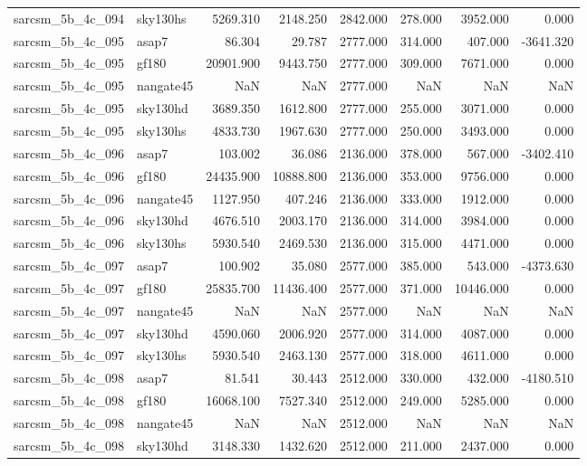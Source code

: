 \begin{tabular}{llrrrrrr}
sarcsm\_5b\_4c\_094 & sky130hs & 5269.310 & 2148.250 & 2842.000 & 278.000 & 3952.000 & 0.000 \\
sarcsm\_5b\_4c\_095 & asap7 & 86.304 & 29.787 & 2777.000 & 314.000 & 407.000 & -3641.320 \\
sarcsm\_5b\_4c\_095 & gf180 & 20901.900 & 9443.750 & 2777.000 & 309.000 & 7671.000 & 0.000 \\
sarcsm\_5b\_4c\_095 & nangate45 & NaN & NaN & 2777.000 & NaN & NaN & NaN \\
sarcsm\_5b\_4c\_095 & sky130hd & 3689.350 & 1612.800 & 2777.000 & 255.000 & 3071.000 & 0.000 \\
sarcsm\_5b\_4c\_095 & sky130hs & 4833.730 & 1967.630 & 2777.000 & 250.000 & 3493.000 & 0.000 \\
sarcsm\_5b\_4c\_096 & asap7 & 103.002 & 36.086 & 2136.000 & 378.000 & 567.000 & -3402.410 \\
sarcsm\_5b\_4c\_096 & gf180 & 24435.900 & 10888.800 & 2136.000 & 353.000 & 9756.000 & 0.000 \\
sarcsm\_5b\_4c\_096 & nangate45 & 1127.950 & 407.246 & 2136.000 & 333.000 & 1912.000 & 0.000 \\
sarcsm\_5b\_4c\_096 & sky130hd & 4676.510 & 2003.170 & 2136.000 & 314.000 & 3984.000 & 0.000 \\
sarcsm\_5b\_4c\_096 & sky130hs & 5930.540 & 2469.530 & 2136.000 & 315.000 & 4471.000 & 0.000 \\
sarcsm\_5b\_4c\_097 & asap7 & 100.902 & 35.080 & 2577.000 & 385.000 & 543.000 & -4373.630 \\
sarcsm\_5b\_4c\_097 & gf180 & 25835.700 & 11436.400 & 2577.000 & 371.000 & 10446.000 & 0.000 \\
sarcsm\_5b\_4c\_097 & nangate45 & NaN & NaN & 2577.000 & NaN & NaN & NaN \\
sarcsm\_5b\_4c\_097 & sky130hd & 4590.060 & 2006.920 & 2577.000 & 314.000 & 4087.000 & 0.000 \\
sarcsm\_5b\_4c\_097 & sky130hs & 5930.540 & 2463.130 & 2577.000 & 318.000 & 4611.000 & 0.000 \\
sarcsm\_5b\_4c\_098 & asap7 & 81.541 & 30.443 & 2512.000 & 330.000 & 432.000 & -4180.510 \\
sarcsm\_5b\_4c\_098 & gf180 & 16068.100 & 7527.340 & 2512.000 & 249.000 & 5285.000 & 0.000 \\
sarcsm\_5b\_4c\_098 & nangate45 & NaN & NaN & 2512.000 & NaN & NaN & NaN \\
sarcsm\_5b\_4c\_098 & sky130hd & 3148.330 & 1432.620 & 2512.000 & 211.000 & 2437.000 & 0.000 \\

\end{tabular}

